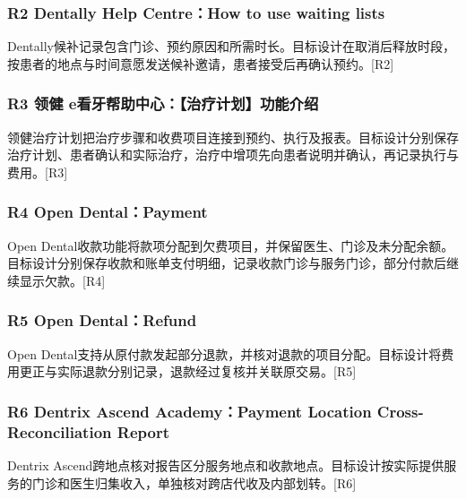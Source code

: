 \documentclass[UTF8,12pt,a4paper,fontset=none]{ctexart}
\begin{document}
\subsubsection{R2 Dentally Help Centre：How to use waiting lists}
Dentally候补记录包含门诊、预约原因和所需时长。目标设计在取消后释放时段，按患者的地点与时间意愿发送候补邀请，患者接受后再确认预约。[R2]\par
\subsubsection{R3 领健 e看牙帮助中心：【治疗计划】功能介绍}
领健治疗计划把治疗步骤和收费项目连接到预约、执行及报表。目标设计分别保存治疗计划、患者确认和实际治疗，治疗中增项先向患者说明并确认，再记录执行与费用。[R3]\par
\subsubsection{R4 Open Dental：Payment}
Open Dental收款功能将款项分配到欠费项目，并保留医生、门诊及未分配余额。目标设计分别保存收款和账单支付明细，记录收款门诊与服务门诊，部分付款后继续显示欠款。[R4]\par
\subsubsection{R5 Open Dental：Refund}
Open Dental支持从原付款发起部分退款，并核对退款的项目分配。目标设计将费用更正与实际退款分别记录，退款经过复核并关联原交易。[R5]\par
\subsubsection{R6 Dentrix Ascend Academy：Payment Location Cross-Reconciliation Report}
Dentrix Ascend跨地点核对报告区分服务地点和收款地点。目标设计按实际提供服务的门诊和医生归集收入，单独核对跨店代收及内部划转。[R6]\par
\Needspace{378pt}
\end{document}
